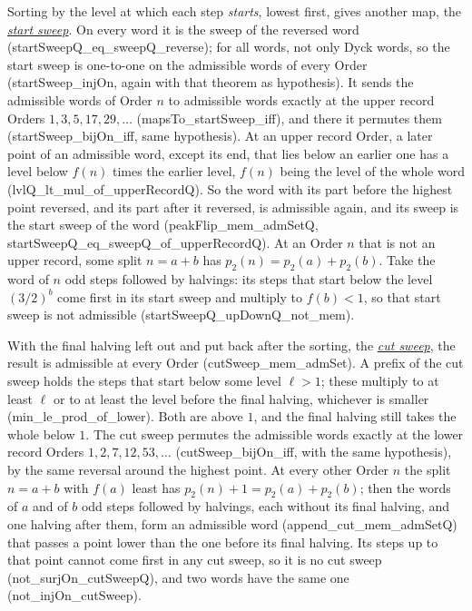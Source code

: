 \documentclass[11pt,a4paper,titlepage]{article}
\makeatletter
\newcommand{\termhere}[1]{\leavevmode
  \Hy@raisedlink{\hyper@anchorstart{term:#1}\hyper@anchorend}}
\newcommand{\keyterm}[2]{\hyperlink{box:#1}{\emph{#2}}}
\newcommand{\lean}[1]{\textsf{#1}}
\makeatother
\begin{document}
\termhere{startsweep}Sorting by the level at which each step \emph{starts}, lowest first, gives another
map, the \keyterm{startsweep}{start sweep}. On every word it is the sweep of the reversed word
(\lean{startSweepQ\_eq\_sweepQ\_reverse}); for all words, not only Dyck words,
so the start sweep is one-to-one on the admissible words of every Order
(\lean{startSweep\_injOn}, again with that theorem as hypothesis). It sends the admissible
words of Order $n$ to admissible words exactly at the upper record Orders $1, 3, 5, 17, 29, \dots$
(\lean{mapsTo\_startSweep\_iff}), and there it permutes them (\lean{startSweep\_bijOn\_iff}, same hypothesis).
At an upper record Order, a later point of an admissible word, except its end, that lies
below an earlier one has a level below $f(n)$ times the earlier level, $f(n)$ being the
level of the whole word (\lean{lvlQ\_lt\_mul\_of\_upperRecordQ}). So the word with its part
before the highest point reversed, and its part after it reversed, is admissible again, and
its sweep is the start sweep of the word (\lean{peakFlip\_mem\_admSetQ},
\lean{startSweepQ\_eq\_sweepQ\_of\_upperRecordQ}). At an Order $n$ that is not an upper
record, some split $n = a + b$ has $p_2(n) = p_2(a) + p_2(b)$. Take the word of $n$ odd
steps followed by halvings: its steps that start below the level $(3/2)^b$ come first in
its start sweep and multiply to $f(b) < 1$, so that start sweep is not admissible
(\lean{startSweepQ\_upDownQ\_not\_mem}).

\termhere{cutsweep}With the final halving left out and put back after the sorting, the \keyterm{cutsweep}{cut
sweep}, the result is admissible at every Order (\lean{cutSweep\_mem\_admSet}). A prefix of
the cut sweep holds the steps that start below some level $\ell > 1$; these multiply to at
least $\ell$ or to at least the level before the final halving, whichever is smaller
(\lean{min\_le\_prod\_of\_lower}). Both are above $1$, and the final halving still takes
the whole below $1$. The cut sweep permutes the admissible words exactly at the lower
record Orders $1, 2, 7, 12, 53, \dots$ (\lean{cutSweep\_bijOn\_iff}, with the same
hypothesis), by the same reversal around the highest point. At every other Order $n$ the
split $n = a + b$ with $f(a)$ least has $p_2(n) + 1 = p_2(a) + p_2(b)$; then the words of $a$ and of $b$ odd
steps followed by halvings, each without its final halving, and one halving after them,
form an admissible word (\lean{append\_cut\_mem\_admSetQ}) that passes a point lower than
the one before its final halving. Its steps up to that point cannot come first in any cut
sweep, so it is no cut sweep (\lean{not\_surjOn\_cutSweepQ}), and two words have the same
one (\lean{not\_injOn\_cutSweep}).
\end{document}
